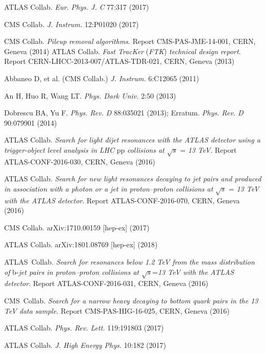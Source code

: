 \documentclass{ar-1col}
\begin{document}
\begin{thebibliography}{175}
{ATLAS Collab}.  \textit{Eur. Phys. J.} \textit{C} 77:317 (2017)

CMS Collab. \textit{J. Instrum.} 12:P01020 (2017)

CMS Collab. \textit{Pileup removal algorithms}. Report CMS-PAS-JME-14-001, CERN, Geneva (2014)
%
ATLAS Collab. \textit{Fast TracKer} (\textit{FTK}) \textit{technical design report}. Report CERN-LHCC-2013-007/ATLAS-TDR-021, CERN, Geneva
(2013)

{Abbaneo D, et al. (CMS Collab}.) \textit{J. Instrum.} 6:C12065 (2011)

An H, Huo R, Wang LT. \textit{Phys. Dark Univ.} 2:50 (2013)

Dobrescu BA, Yu F. \textit{Phys. Rev.} \textit{D} 88:035021 (2013); Erratum. \textit{Phys. Rev. D} 90:079901 (2014)

{ATLAS Collab}. \textit{Search for light dijet resonances with the ATLAS detector using a
trigger-object level analysis in LHC }pp \textit{collisions at} $\sqrt{s}$ = \textit{13 TeV}. Report ATLAS-CONF-2016-030, CERN, Geneva (2016)

{ATLAS Collab}. \textit{Search for new light resonances decaying to jet pairs and produced in association with a photon or a jet in proton--proton collisions at}
$\sqrt{s}$ = \textit{13 TeV with the ATLAS detector}. Report ATLAS-CONF-2016-070, CERN, Geneva (2016)

{CMS Collab}. arXiv:1710.00159 [hep-ex] (2017)

{ATLAS Collab}. arXiv:1801.08769 [hep-ex] (2018)

{ATLAS~Collab}. \textit{Search for resonances below 1.2 TeV from the mass distribution of }b-\textit{jet pairs in proton--proton collisions at} $\sqrt{s}$=\textit{13 TeV with the ATLAS detector}. Report ATLAS-CONF-2016-031, CERN, Geneva (2016)

{CMS~Collab}. \textit{Search for a narrow heavy decaying to bottom quark pairs in the 13 TeV data sample}.
Report {CMS-PAS-HIG-16-025}, CERN, Geneva (2016)

{ATLAS Collab}. \textit{Phys. Rev. Lett.} 119:191803 (2017)

{ATLAS Collab}. \textit{J. High Energy Phys.} 10:182 (2017)


\end{thebibliography}
\end{document}
